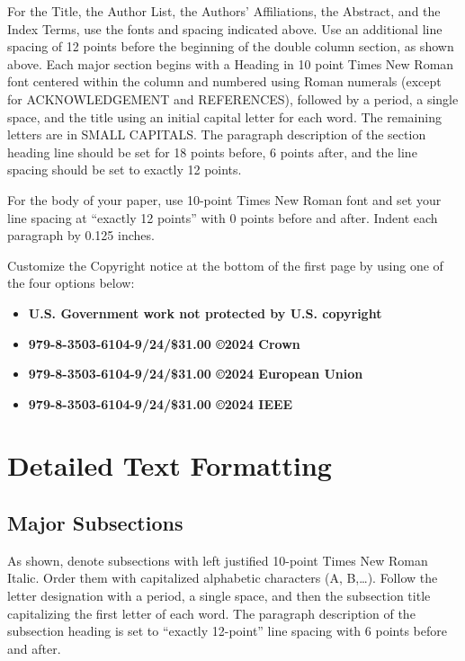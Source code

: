\documentclass[]{IEEEtran}
\begin{document}
For the Title, the Author List, the Authors’ Affiliations, the Abstract, and the Index Terms, use the fonts and spacing indicated above. Use an additional line spacing of 12 points before the beginning of the double column section, as shown above. Each major section begins with a Heading in 10 point Times New Roman font centered within the column and numbered using Roman numerals (except for ACKNOWLEDGEMENT and REFERENCES), followed by a period, a single space, and the title using an initial capital letter for each word. The remaining letters are in SMALL CAPITALS. The paragraph description of the section heading line should be set for 18 points before, 6 points after, and the line spacing should be set to exactly 12 points.

For the body of your paper, use 10-point Times New Roman font and set your line spacing at ``exactly 12 points'' with 0 points before and after. Indent each paragraph by 0.125 inches. 

Customize the Copyright notice at the bottom of the first page by using one of the four options below:
\newline
\begin{itemize}
\item 
{\selectfont \small \textbf{U.S. Government work not protected by U.S. copyright} }
\item
{\selectfont \small \textbf{979-8-3503-6104-9/24/\$31.00 \copyright 2024 Crown} }
\item 
{\selectfont \small \textbf{979-8-3503-6104-9/24/\$31.00 \copyright 2024 European Union} }
\item
{\selectfont \small \textbf{979-8-3503-6104-9/24/\$31.00 \copyright 2024 IEEE} }
\end{itemize}

%
\IEEEpubidadjcol

\section{Detailed Text Formatting}
\subsection{ Major Subsections}
As shown, denote subsections with left justified 10-point Times New Roman
Italic. Order them with capitalized alphabetic characters (A, B,\dots ). Follow the letter designation with a period, a single space, and then the subsection title capitalizing the first letter of each word. The paragraph description of the subsection heading is set to ``exactly
12-point'' line spacing with 6 points before and after.
\end{document}
